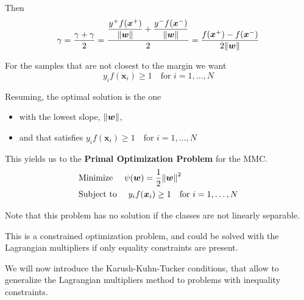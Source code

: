 \documentclass[oneside,onecolumn]{report}
\begin{document}
Then
$$ \gamma = \frac{\gamma + \gamma}{2} = \frac{\displaystyle \frac{y^+ f(\bm x^+)}{\norm{\bm w}} + \frac{y^- f(\bm x^-)}{\norm{\bm w}}}{2} = \frac{f(\bm x^+) - f(\bm x^-)}{2 \norm{\bm w}} $$

For the samples that are not closest to the margin we want
$$ y_i f(\bm x_i) \geq 1 \quad \text{for } i = 1, \dots, N $$

Resuming, the optimal solution is the one
\begin{itemize}
    \item with the lowest slope, $\norm{\bm w}$,
    \item and that satisfies $y_i f(\bm x_i) \geq 1 \quad \text{for } i = 1, \dots, N $
\end{itemize}

This yields us to the \textbf{Primal Optimization Problem} for the MMC.
\begin{align*}
    &\text{Minimize   } \quad \psi(\bm w) = \frac{1}{2} \norm{\bm w}^2 \\
    &\text{Subject to } \quad y_i f(\bm x_i) \geq 1 \quad \text{for } i = 1, \dots, N
\end{align*}

Note that this problem has no solution if the classes are not linearly separable.

This is a constrained optimization problem, and could be solved with the Lagrangian multipliers if only equality constraints are present.

We will now introduce the Karush-Kuhn-Tucker conditions, that allow to generalize the Lagrangian multipliers method to problems with inequality constraints.
\end{document}
